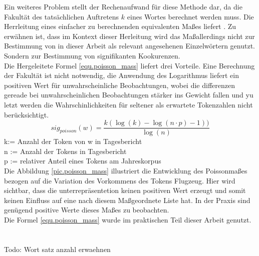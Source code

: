 Ein weiteres Problem stellt der Rechenaufwand f\"ur diese Methode dar, da die Fakult\"at des tats\"achlichen Auftretens $k$ eines Wortes berechnet werden muss. Die Herrleitung eines einfacher zu berechnenden 
equivalenten Ma\ss es liefert \cite[S. 338 ff]{heyer06}. Zu erw\"ahnen ist, dass im Kontext dieser Herleitung wird das Ma\ss allerdings nicht zur Bestimmung von in dieser Arbeit als relevant angesehenen Einzelw\"ortern genutzt. Sondern zur Bestimmung von signifikanten Kookurenzen. \\
Die Hergeleitete Formel \ref{equ.poisson_mass} liefert drei Vorteile. Eine Berechnung der Fakult\"at ist nicht notwendig, die Anwendung des Logarithmus liefert ein positiven Wert f\"ur unwahrscheinliche Beobachtungen, wobei die differenzen gereade bei unwahrscheinlichen Beobachtungen st\"arker ins Gewicht fallen und yu letzt werden die Wahrschinlichkeiten f\"ur seltener als erwartete Tokenzahlen nicht ber\"ucksichtigt. 
 \begin{equation}\label{equ.poisson_mass}
		sig_{poisson}(w) = \frac{k(\log(k)-\log(n\cdot p) -1 ))}{\log(n)} 
 \end{equation}
 k:= Anzahl der Token von w in Tagesbericht\\
n := Anzahl der Tokens in Tagesbericht\\
p := relativer Anteil eines Tokens am Jahreskorpus\\

Die Abbildung \ref{pic.poisson_mass} illustriert die Entwicklung des Poissonma\ss es bezogen auf die Variation des Vorkommens des Tokens Flugzeug. Hier wird sichtbar, dass die unterrepr\"asentetion keinen positiven Wert erzeugt und somit keinen Einfluss auf eine nach diesem Ma\ss  geordnete Liste hat. In der Praxis sind gen\"ugend positive Werte dieses Ma\ss es zu beobachten.\\
Die Formel \ref{equ.poisson_mass} wurde im praktischen Teil dieser Arbeit genutzt.\\
\\ \\Todo: Wort satz anzahl erwaehnen \\ \\ 

